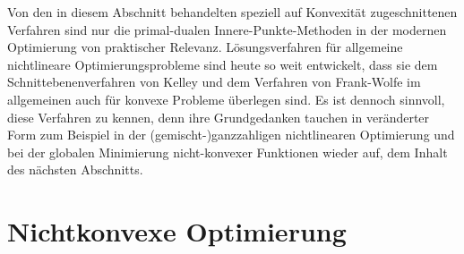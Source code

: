 \documentclass[12pt]{extreport} %
\theoremstyle{named}
\theoremstyle{nnamed}
\theoremstyle{itshape}
\theoremstyle{normal}
\begin{document}
Von den in diesem Abschnitt behandelten speziell auf Konvexität zugeschnittenen Verfahren sind nur die primal-dualen Innere-Punkte-Methoden in der modernen Optimierung von praktischer Relevanz. Lösungsverfahren für allgemeine nichtlineare Optimierungsprobleme sind heute so weit entwickelt, dass sie dem Schnittebenenverfahren von Kelley und dem Verfahren von Frank-Wolfe im allgemeinen auch für konvexe Probleme überlegen sind. Es ist dennoch sinnvoll, diese Verfahren zu kennen, denn ihre Grundgedanken tauchen in veränderter Form zum Beispiel in der (gemischt-)ganzzahligen nichtlinearen Optimierung und bei der globalen Minimierung nicht-konvexer Funktionen wieder auf, dem Inhalt des nächsten Abschnitts.

\chapter{Nichtkonvexe Optimierung}

\end{document}
